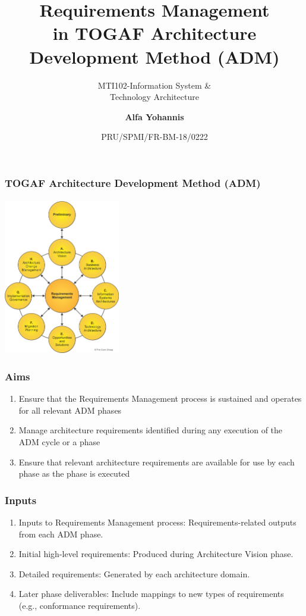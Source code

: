 \documentclass[aspectratio=169, table]{beamer}
\subtitle{MTI102-Information System \&\\Technology Architecture}
\title{\Large Requirements Management\\in TOGAF
	Architecture\\Development Method (ADM)}
\date[Serial]{\scriptsize {PRU/SPMI/FR-BM-18/0222}}
\author[Pradita]{\small {\textbf{Alfa Yohannis}}}
\begin{document}
	
	\frame{\titlepage}
	
	
	{
		\begin{frame}
			\frametitle{TOGAF Architecture Development Method (ADM)}
			\framesubtitle{\hspace{1cm}}
			\vspace{10pt}
			\begin{center}
				\includegraphics[width=0.38\textwidth]{../figures/adm}
			\end{center}
		\end{frame}
	}
	
	
	\begin{frame}
		\frametitle{Aims}
		\begin{enumerate}
			\item Ensure that the Requirements Management process is sustained and operates for all relevant ADM phases
			\item Manage architecture requirements identified during any execution of the ADM cycle or a phase
			\item Ensure that relevant architecture requirements are available for use by each phase as the phase is executed
		\end{enumerate}
		
	\end{frame}
	
		\begin{frame}
		\frametitle{Inputs}
		\vspace{20pt}
		\begin{enumerate}
			\item Inputs to Requirements Management process: Requirements-related outputs from each ADM phase.
			\item Initial high-level requirements: Produced during Architecture Vision phase.
			\item Detailed requirements: Generated by each architecture domain.
			\item Later phase deliverables: Include mappings to new types of requirements (e.g., conformance requirements).
		\end{enumerate}
	\end{frame}
	
\end{document}
